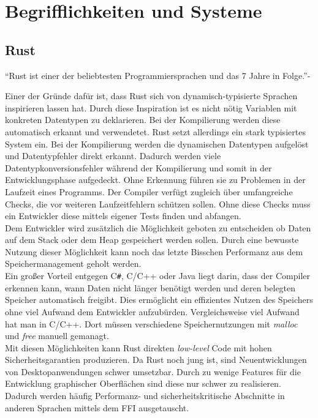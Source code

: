 
\section{Begrifflichkeiten und Systeme}

\subsection{Rust}

"`Rust ist einer der beliebtesten Programmiersprachen und das 7 Jahre in Folge."'-\cite{stack_rust}

Einer der Gründe dafür ist, dass Rust sich von dynamisch-typisierte
Sprachen inspirieren lassen hat. Durch diese Inspiration
ist es nicht nötig
Variablen mit konkreten Datentypen zu deklarieren. Bei der
Kompilierung werden diese automatisch erkannt und verwendetet.
Rust setzt allerdings ein stark typisiertes System ein.
Bei der Kompilierung werden die dynamischen Datentypen aufgelöst
und Datentypfehler direkt erkannt.
Dadurch werden viele Datentypkonversionsfehler während der Kompilierung und somit
in der Entwicklungsphase aufgedeckt. Ohne Erkennung führen
sie zu Problemen in der Laufzeit eines Programms.
Der Compiler verfügt zugleich über umfangreiche
Checks, die vor weiteren Laufzeitfehlern schützen sollen.
Ohne diese Checks muss ein Entwickler diese mittels eigener Tests finden und abfangen.
\\
Dem Entwickler wird zusätzlich die Möglichkeit geboten zu entscheiden
ob Daten auf dem Stack oder dem Heap
gespeichert werden sollen. Durch eine bewusste Nutzung
dieser Möglichkeit kann noch das letzte Bisschen
Performanz aus dem Speichermanagement geholt werden.
\\
Ein großer Vorteil entgegen C\verb|#|, C/C++ oder Java liegt darin, dass
der Compiler erkennen kann, wann Daten nicht länger benötigt werden
und deren belegten Speicher automatisch freigibt. Dies ermöglicht ein effizientes
Nutzen des Speichers ohne viel Aufwand dem Entwickler aufzubürden.
Vergleichsweise viel Aufwand hat man in C/C++. Dort müssen
verschiedene Speichernutzungen mit \emph{malloc} und \emph{free} manuell gemanagt.
\\
Mit diesen Möglichkeiten kann Rust direkten \emph{low-level} Code mit
hohen Sicherheitsgarantien produzieren.
Da Rust noch jung ist, sind Neuentwicklungen
von Desktopanwendungen schwer umsetzbar. Durch zu wenige
Features für die Entwicklung graphischer Oberflächen sind diese
nur schwer zu realisieren. Dadurch
werden häufig Performanz- und sicherheitskritische
Abschnitte in anderen Sprachen mittels
dem \acf{FFI} ausgetauscht. \cite{rust_overflow_blog}


